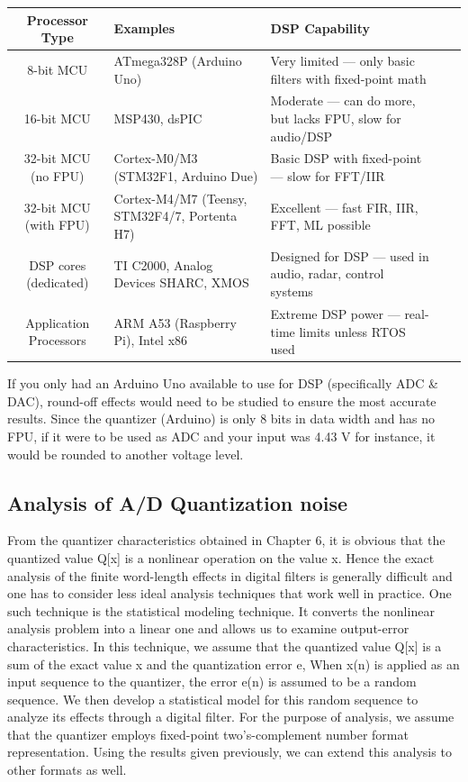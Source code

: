 \documentclass{article}
\begin{document}
\begin{tabularx}{\textwidth}{|c|X|X|X|X|}
\hline
\textbf{Processor Type} & \textbf{Examples} & \textbf{DSP Capability}  \\
\hline
8-bit MCU & ATmega328P (Arduino Uno) & Very limited — only basic filters with fixed-point math \\
\hline
16-bit MCU & MSP430, dsPIC & Moderate — can do more, but lacks FPU, slow for audio/DSP \\
\hline
32-bit MCU (no FPU) & Cortex-M0/M3 (STM32F1, Arduino Due) & Basic DSP with fixed-point — slow for FFT/IIR \\
\hline
32-bit MCU (with FPU) & Cortex-M4/M7 (Teensy, STM32F4/7, Portenta H7) &  Excellent — fast FIR, IIR, FFT, ML possible \\
\hline
DSP cores (dedicated) & TI C2000, Analog Devices SHARC, XMOS & Designed for DSP — used in audio, radar, control systems \\
\hline
Application Processors & ARM A53 (Raspberry Pi), Intel x86 &  Extreme DSP power — real-time limits unless RTOS used \\
\hline
\end{tabularx}
If you only had an Arduino Uno available to use for DSP (specifically ADC \& DAC), round-off effects would need to be studied to ensure the most accurate results. Since the quantizer (Arduino) is only 8 bits in data width and has no FPU, if it were to be used as ADC and your input was 4.43 V for instance, it would be rounded to another voltage level.
\subsection{Analysis of A/D Quantization noise}
From the quantizer characteristics obtained in Chapter 6, it is obvious
that the quantized value Q[x] is a nonlinear operation on the value x.
Hence the exact analysis of the finite word-length effects in digital filters
is generally difficult and one has to consider less ideal analysis techniques
that work well in practice. One such technique is the statistical modeling technique. It converts
the nonlinear analysis problem into a linear one and allows us to examine output-error characteristics. In this technique, we assume that the quantized value Q[x] is a sum of the exact value x and the quantization error e, When x(n) is applied as an
input sequence to the quantizer, the error e(n) is assumed to be a random
sequence. We then develop a statistical model for this random sequence
to analyze its effects through a digital filter.
For the purpose of analysis, we assume that the quantizer employs
fixed-point two's-complement number format representation. Using the
results given previously, we can extend this analysis to other formats as
well.
\end{document}
